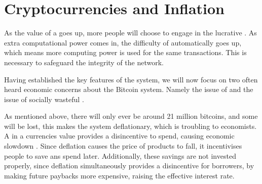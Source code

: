 
\chapter{Cryptocurrencies and Inflation}

As the value of a  goes up, more people
will choose to engage in the lucrative .
As extra computational power comes in, the difficulty of 
automatically goes up, which means more computing power is used for
the same transactions. This is necessary to safeguard the integrity
of the network.

Having established the key features of the 
system, we will now focus on two often heard economic concerns about
the Bitcoin system. Namely the issue of 
and the issue of socially wasteful .

As mentioned above, there will only ever be around 21 million bitcoins,
and some will be lost, this makes the system deflationary, which is
troubling to economists. A  in a currencies
value provides a disincentive to spend, causing economic slowdown
\citep[see e.g.][]{fisher1933debt}. Since deflation causes the price
of products to fall, it incentivises people to save ans spend later.
Additionally, these savings are not invested properly, since deflation
simultaneously provides a disincentive for borrowers, by making future
paybacks more expensive, raising the effective interest rate.
